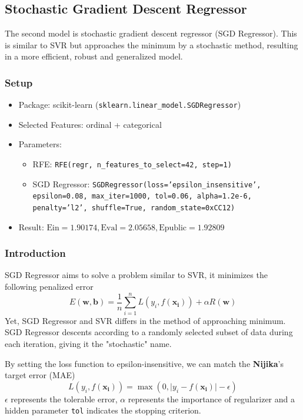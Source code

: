 \documentclass[10pt,letterpaper]{article}
\begin{document}
\subsection{Stochastic Gradient Descent Regressor}

The second model is stochastic gradient descent regressor (SGD Regressor). This is similar to SVR but approaches the minimum by a stochastic method, resulting in a more efficient, robust and generalized model.

\subsubsection{Setup}
\begin{itemize}
	\item Package: scikit-learn (\verb|sklearn.linear_model.SGDRegressor|)
	\item Selected Features: ordinal + categorical
	\item Parameters:\begin{itemize}
		\item RFE: \verb|RFE(regr, n_features_to_select=42, step=1)|
		\item SGD Regressor: \texttt{SGDRegressor(loss='epsilon\_insensitive', epsilon=0.08, max\_iter=1000, tol=0.06, alpha=1.2e-6, penalty='l2',  shuffle=True, random\_state=0xCC12)}
	\end{itemize}
	\item Result: $\text{Ein} = 1.90174, \text{Eval} = 2.05658, \text{Epublic} = 1.92809$
\end{itemize}

\subsubsection{Introduction}

SGD Regressor aims to solve a problem similar to SVR, it minimizes the following penalized error
$$
	E(\mathbf{w}, \mathbf{b}) = \frac{1}{n}\sum_{i=1}^n L(y_i, f(\mathbf{x_i})) + \alpha R(\mathbf{w})
$$
Yet, SGD Regressor and SVR differs in the method of approaching minimum. SGD Regressor descents according to a randomly selected subset of data during each iteration, giving it the "stochastic" name. 

By setting the loss function to epsilon-insensitive, we can match the \textbf{Nijika}'s target error (MAE)
$$
	L(y_i, f(\mathbf{x_i})) = \max(0, \lvert y_i - f(\mathbf{x_i})\rvert - \epsilon)
$$
$\epsilon$ represents the tolerable error, $\alpha$ represents the importance of regularizer and a hidden parameter \texttt{tol} indicates the stopping criterion. 
\end{document}
